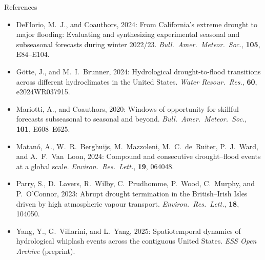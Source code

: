 \documentclass[aspectratio=169]{beamer}
\begin{document}
\begin{frame}{References}

    \scriptsize
    \begin{itemize}\setlength{\itemsep}{0.4em}

    \item DeFlorio, M.~J., and Coauthors, 2024: From California's extreme drought to major flooding: Evaluating and synthesizing experimental seasonal and subseasonal forecasts during winter 2022/23. \textit{Bull.\ Amer.\ Meteor.\ Soc.}, \textbf{105}, E84--E104.

    \item G\"otte, J., and M.~I.~Brunner, 2024: Hydrological drought-to-flood transitions across different hydroclimates in the United States. \textit{Water Resour.\ Res.}, \textbf{60}, e2024WR037915.

    \item Mariotti, A., and Coauthors, 2020: Windows of opportunity for skillful forecasts subseasonal to seasonal and beyond. \textit{Bull.\ Amer.\ Meteor.\ Soc.}, \textbf{101}, E608--E625.

    \item Matan\'o, A., W.~R.~Berghuijs, M.~Mazzoleni, M.~C.~de~Ruiter, P.~J.~Ward, and A.~F.~Van~Loon, 2024: Compound and consecutive drought--flood events at a global scale. \textit{Environ.\ Res.\ Lett.}, \textbf{19}, 064048.

    \item Parry, S., D.~Lavers, R.~Wilby, C.~Prudhomme, P.~Wood, C.~Murphy, and P.~O'Connor, 2023: Abrupt drought termination in the British--Irish Isles driven by high atmospheric vapour transport. \textit{Environ.\ Res.\ Lett.}, \textbf{18}, 104050.

    \item Yang, Y., G.~Villarini, and L.~Yang, 2025: Spatiotemporal dynamics of hydrological whiplash events across the contiguous United States. \textit{ESS Open Archive} (preprint).

    \end{itemize}

\end{frame}
\end{document}
